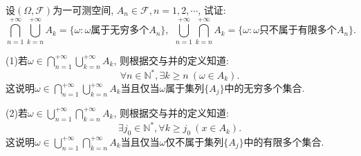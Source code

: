 \begin{yyEx}
	设$(\Omega,\mathscr{F})$为一可测空间, $A_n\in\mathscr{F},n=1,2,\cdots$, 试证:
	\begin{equation}
	\bigcap_{n=1}^{+\infty}\bigcup_{k=n}^{+\infty}A_k = \{ \omega:\omega\text{属于无穷多个}A_n \},~~\bigcup_{n=1}^{+\infty}\bigcap_{k=n}^{+\infty}A_k = \{ \omega:\omega\text{只不属于有限多个}A_n \}.
	\end{equation}
\end{yyEx}
\begin{yyProof}
	(1)若$\omega\in\bigcap_{n=1}^{+\infty}\bigcup_{k=n}^{+\infty}A_k$, 则根据交与并的定义知道:\begin{equation}
	\forall n\in\mathbb{N}^*,\exists k\geqslant n~\left( \omega\in A_k \right).
	\end{equation}
	这说明$\omega\in\bigcap_{n=1}^{+\infty}\bigcup_{k=n}^{+\infty}A_k$当且仅当$\omega$属于集列$\{A_j\}$中的无穷多个集合.
	
	(2)若$\omega\in\bigcup_{n=1}^{+\infty}\bigcap_{k=n}^{+\infty}A_k$, 则根据交与并的定义知道:
	\begin{equation}
	\exists j_0\in\mathbb{N}^*,\forall k\geqslant j_0~\left( x\in A_k \right).
	\end{equation}
	这说明$\omega\in\bigcup_{n=1}^{+\infty}\bigcap_{k=n}^{+\infty}A_k$当且仅当$\omega$仅不属于集列$\{A_j\}$中的有限多个集合.
\end{yyProof}

